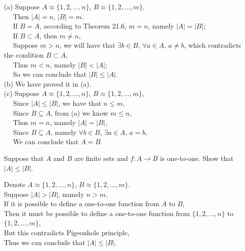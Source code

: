 \documentclass[11pt, a4paper, UTF8]{ctexart}
\begin{document}
\begin{solution}
  (a) Suppose $A \approx \{ 1,2,...,n \}$, $B \approx \{ 1,2,...,m \}$,\\
  $~~~~~~$Then $|A| = n$, $|B| = m$.\\
  $~~~~~~$If $B = A$, according to Theorem 21.6, $m = n$, namely 
  $|A| = |B|$;\\
  $~~~~~~$If $B \subset A$, then $m \neq n$,\\
  $~~~~~~$Suppose $m > n$, we will have that $\exists b \in B$, 
  $\forall a \in A$, $a \neq b$, which contradicts the condition 
  $B \subset A$,\\
  $~~~~~~$Thus $m < n$, namely $|B| < |A|$;\\
  $~~~~~~$So we can conclude that $|B| \leq |A|$.\\
  (b) We have proved it in (a).\\
  (c) Suppose $A \approx \{ 1,2,...,n \}$, $B \approx \{ 1,2,...,m \}$,\\
  $~~~~~~$Since $|A| \leq |B|$, we have that $n \leq m$,\\
  $~~~~~~$Since $B \subseteq A$, from (a) we know $m \leq n$,\\
  $~~~~~~$Thus $m = n$, namely $|A| = |B|$,\\
  $~~~~~~$Since $B \subseteq A$, namely $\forall b \in B$, $\exists a \in A$, 
  $a = b$,\\
  $~~~~~~$We can conclude that $A = B$.
\end{solution}

\begin{problem}[UD: 21.17]
  Suppose that $A$ and $B$ are finite sets and $f: A \rightarrow B$ 
  is one-to-one. Show that $|A| \leq |B|$.
\end{problem}

\begin{solution}
  Denote $A \approx \{ 1,2,...,n \}$, $B \approx \{ 1,2,...,m \}$.\\
  Suppose $|A| > |B|$, namely $n > m$,\\
  If it is possible to define a one-to-one function from $A$ to $B$,\\
  Then it must be possible to define a one-to-one function from 
  $\{ 1,2,...,n \}$ to $\{ 1,2,...,m \}$,\\
  But this contradicts Pigeonhole principle,\\
  Thus we can conclude that $|A| \leq |B|$.
\end{solution}
\end{document}
